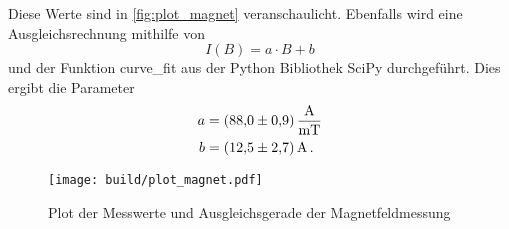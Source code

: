 Diese Werte sind in \autoref{fig:plot_magnet} veranschaulicht. 
Ebenfalls wird eine Ausgleichsrechnung mithilfe von
\begin{equation}
    I(B) = a \cdot B + b
\end{equation}
und der Funktion curve\_fit aus der Python Bibliothek SciPy durchgeführt. \cite{scipy}
Dies ergibt die Parameter
\begin{align}
    a &= \SI{88.0+-0.9}{\ampere\per\milli\tesla} \\
    b &= \SI{12.5+-2.7}{\ampere} \, .
\end{align}

\begin{figure}
    \centering
    \texttt{[image: build/plot\_magnet.pdf]}
    \caption{Plot der Messwerte und Ausgleichsgerade der Magnetfeldmessung}
    \label{fig:plot_magnet}
\end{figure}
